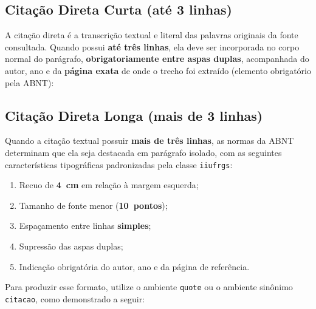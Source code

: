 \documentclass[cic,tc,biblatex]{iiufrgs}
\begin{document}
\subsection{Citação Direta Curta (até 3 linhas)}
A citação direta é a transcrição textual e literal das palavras originais da fonte consultada. Quando possui \textbf{até três linhas}, ela deve ser incorporada no corpo normal do parágrafo, \textbf{obrigatoriamente entre aspas duplas}, acompanhada do autor, ano e da \textbf{página exata} de onde o trecho foi extraído (elemento obrigatório pela ABNT):

\subsection{Citação Direta Longa (mais de 3 linhas)}
Quando a citação textual possuir \textbf{mais de três linhas}, as normas da ABNT determinam que ela seja destacada em parágrafo isolado, com as seguintes características tipográficas padronizadas pela classe \texttt{iiufrgs}:
\begin{enumerate}
    \item Recuo de \textbf{4~cm} em relação à margem esquerda;
    \item Tamanho de fonte menor (\textbf{10~pontos});
    \item Espaçamento entre linhas \textbf{simples};
    \item Supressão das aspas duplas;
    \item Indicação obrigatória do autor, ano e da página de referência.
\end{enumerate}

Para produzir esse formato, utilize o ambiente \texttt{quote} ou o ambiente sinônimo \texttt{citacao}, como demonstrado a seguir:
\end{document}
